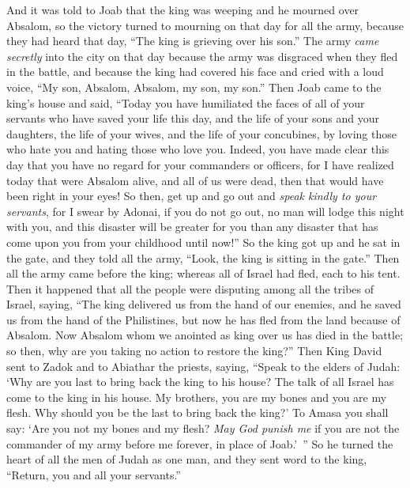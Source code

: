 \begin{biblechapter} %
 And it was told to Joab that the king was weeping and he mourned over Absalom,
\verse so the victory turned to mourning on that day for all the army, because they had heard that day, “The king is grieving over his son.”
\verse The army \textit{came secretly} into the city on that day because the army was disgraced when they fled in the battle,
\verse and because the king had covered his face and cried with a loud voice, “My son, Absalom, Absalom, my son, my son.”
\verse Then Joab came to the king’s house and said, “Today you have humiliated the faces of all of your servants who have saved your life this day, and the life of your sons and your daughters, the life of your wives, and the life of your concubines,
\verse by loving those who hate you and hating those who love you. Indeed, you have made clear this day that you have no regard for your commanders or officers, for I have realized today that were Absalom alive, and all of us were dead, then that would have been right in your eyes!
\verse So then, get up and go out and \textit{speak kindly to your servants}, for I swear by Adonai, if you do not go out, no man will lodge this night with you, and this disaster will be greater for you than any disaster that has come upon you from your childhood until now!”
\verse So the king got up and he sat in the gate, and they told all the army, “Look, the king is sitting in the gate.” Then all the army came before the king; whereas all of Israel had fled, each to his tent.
 Then it happened that all the people were disputing among all the tribes of Israel, saying, “The king delivered us from the hand of our enemies, and he saved us from the hand of the Philistines, but now he has fled from the land because of Absalom.
\verse Now Absalom whom we anointed as king over us has died in the battle; so then, why are you taking no action to restore the king?”
\verse Then King David sent to Zadok and to Abiathar the priests, saying, “Speak to the elders of Judah: ‘Why are you last to bring back the king to his house? The talk of all Israel has come to the king in his house.
\verse My brothers, you are my bones and you are my flesh. Why should you be the last to bring back the king?’
\verse To Amasa you shall say: ‘Are you not my bones and my flesh? \textit{May God punish me} if you are not the commander of my army before me forever, in place of Joab.’ ”
\verse So he turned the heart of all the men of Judah as one man, and they sent word to the king, “Return, you and all your servants.”

\end{biblechapter}
